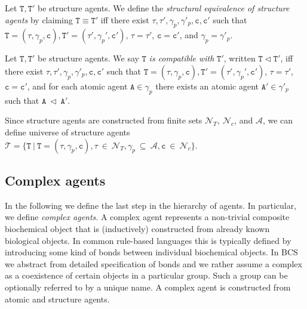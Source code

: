 \documentclass{entcs}
\renewcommand{\~}[0]{\texttildelow}
\begin{document}
\begin{defn}
Let $\mathtt{T},\mathtt{T}'$ be structure agents. We define the \emph{structural equivalence of structure agents} by claiming $\mathtt{T}\equiv\mathtt{T}'$ iff there exist $\tau,\tau',\gamma_p,\gamma'_p,\mathtt{c},\mathtt{c}'$ such that $\mathtt{T}=(\tau, \gamma_p, \mathtt{c}),\mathtt{T}'=(\tau', \gamma_p', \mathtt{c}')$, $\tau=\tau'$, $\mathtt{c} = \mathtt{c}'$, and $\gamma_p=\gamma'_p$.
\end{defn}

\begin{defn}
Let $\mathtt{T},\mathtt{T}'$ be structure agents. We say $\mathtt{T}$ \emph{is compatible with} $\mathtt{T}'$, written $\mathtt{T} \lhd \mathtt{T}'$, iff there exist $\tau,\tau',\gamma_p,\gamma'_p,\mathtt{c},\mathtt{c}'$ such that $\mathtt{T}=(\tau, \gamma_p, \mathtt{c}),\mathtt{T}'=(\tau', \gamma_p', \mathtt{c}')$, $\tau = \tau'$, $\mathtt{c} = \mathtt{c}'$, and for each atomic agent $\mathtt{A} \in \gamma_p$ there exists an atomic agent $\mathtt{A}' \in \gamma'_p$ such that $\mathtt{A}~\lhd~\mathtt{A}'$. 
\end{defn}

\begin{theorem}
Since structure agents are constructed from finite sets $\mathcal{N}_{T},~\mathcal{N}_{c}$, and $\mathcal{A}$, we can define universe of structure agents $\mathcal{T} = \{ \mathtt{T}~|~\mathtt{T} = (\tau, \gamma_p, \mathtt{c}), \tau~\in~\mathcal{N}_{T}, \gamma_p~\subseteq~\mathcal{A},  \mathtt{c}~\in~\mathcal{N}_{c} \}$.
\end{theorem}

\subsection{Complex agents}

In the following we define the last step in the hierarchy of agents. In particular, we define \textit{complex agents}. A complex agent represents a non-trivial composite biochemical object that is (inductively) constructed from already known biological objects. In common rule-based languages this is typically defined by introducing some kind of bonds between individual biochemical objects. In BCS we abstract from detailed specification of bonds and we rather assume a complex as a coexistence of certain objects in a particular group. Such a group can be optionally referred to by a unique name. A complex agent is constructed from atomic and structure agents.
\end{document}
